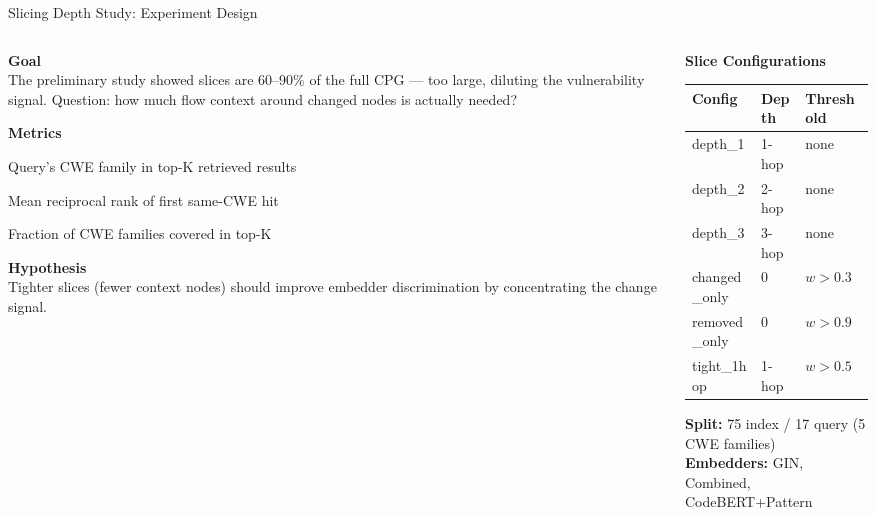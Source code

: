 \documentclass[aspectratio=169,10pt]{beamer}
\begin{document}
\begin{frame}{Slicing Depth Study: Experiment Design}
\begin{columns}[T]
\begin{column}{0.50\textwidth}

  \textbf{Goal}\\[3pt]
  {\small The preliminary study showed slices are 60--90\% of the full CPG —
  too large, diluting the vulnerability signal. Question: how much
  flow context around changed nodes is actually needed?}

  \vspace{0.5em}
  \textbf{Metrics}
  \begin{description}
    \item[\textbf{hit@K}] Query's CWE family in top-K retrieved results
    \item[\textbf{MRR}] Mean reciprocal rank of first same-CWE hit
    \item[\textbf{CWE recall}] Fraction of CWE families covered in top-K
  \end{description}

  \vspace{0.5em}
  \textbf{Hypothesis}\\[3pt]
  {\small Tighter slices (fewer context nodes) should improve embedder
  discrimination by concentrating the change signal.}

\end{column}
\begin{column}{0.47\textwidth}

  {\small\textbf{Slice Configurations}}\\[4pt]
  {\scriptsize
  \renewcommand{\arraystretch}{1.25}
  \begin{tabular}{p{2.2cm}p{1.0cm}p{2.2cm}}
    \toprule
    \textbf{Config} & \textbf{Depth} & \textbf{Threshold} \\
    \midrule
    depth\_1 & 1-hop & none \\
    depth\_2 & 2-hop & none \\
    depth\_3 & 3-hop & none \\
    changed\_only & 0 & $w > 0.3$ \\
    removed\_only & 0 & $w > 0.9$ \\
    tight\_1hop & 1-hop & $w > 0.5$ \\
    \bottomrule
  \end{tabular}}

  \vspace{0.4em}
  {\scriptsize\textbf{Split:} 75 index / 17 query (5 CWE families)\\
  \textbf{Embedders:} GIN, Combined, CodeBERT+Pattern}

\end{column}
\end{columns}
\end{frame}
\end{document}
